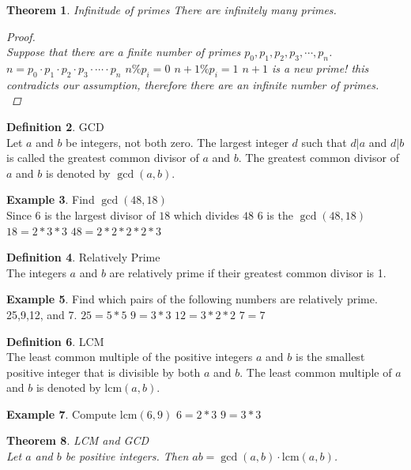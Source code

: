 \documentclass[letterpaper,10pt]{article}
\theoremstyle{plain}
\newtheorem{thm}{Theorem}[section]
\theoremstyle{definition}
\newtheorem{defn}[thm]{Definition}
\newtheorem{exmp}[thm]{Example}
\theoremstyle{remark}
\providecommand{\lcm}{\ensuremath{\text{lcm}}}%
\begin{document}
\begin{thm}{Infinitude of primes} 
There are infinitely many primes.
\begin{proof}
$ $\\
Suppose that there are a finite number of primes $p_0,p_1,p_2,p_3,\cdots,p_n$.
\newline
$n=p_0\cdot p_1\cdot p_2 \cdot p_3 \cdot\cdots\cdot p_n$
\newline
$n\% p_i=0$
\newline
$n+1\% p_i=1$
\newline
$n+1$ is a new prime! this contradicts our assumption, therefore there are an infinite number of primes.
$ $\\
\end{proof}
\end{thm}
\begin{defn}{GCD}$ $\\
Let $a$ and $b$ be integers, not both zero. The largest integer $d$ such that $d | a$ and $d | b$ is called the greatest common divisor of $a$ and $b$. The greatest common divisor of $a$ and $b$ is denoted by $\gcd(a, b)$.
\end{defn}
\begin{exmp}Find $\gcd(48, 18)$
$ $\\
Since 6 is the largest divisor of $18$ which divides $48$ 6 is the $\gcd(48,18)$
\newline
\noindent
$18=2*3*3$\newline
$48=2*2*2*2*3$
\end{exmp}


\begin{defn}{Relatively Prime}$ $\\
The integers $a$ and $b$ are relatively prime if their greatest common divisor is 1.
\end{defn}
\begin{exmp} Find which pairs of the following numbers are relatively prime. 
25,9,12, and 7.
\newline
\noindent
$25=5*5$\newline
$9=3*3$\newline
$12=3*2*2$\newline
$7=7$\newline


\end{exmp}
\begin{defn}{LCM}$ $\\
The least common multiple of the positive integers $a$ and $b$ is the smallest positive integer that is divisible by both $a$ and $b$. The least common multiple of $a$ and $b$ is denoted by $\lcm(a, b)$.
\end{defn}
\begin{exmp}
Compute $\lcm(6,9)$
\newline
$6=2*3$
\newline
$9=3*3$

\end{exmp}
\begin{thm}{LCM and GCD}$ $\\
Let $a$ and $b$ be positive integers. Then $ab = \gcd(a, b) \cdot \lcm(a, b)$.
\end{thm}
\end{document}
